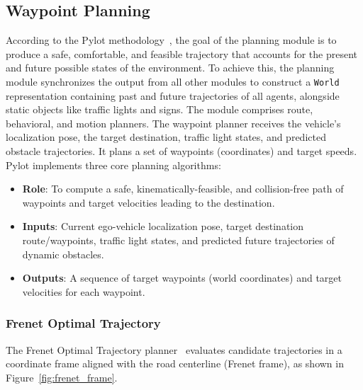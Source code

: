 \documentclass[11pt,a4paper]{report}
\begin{document}
\subsection{Waypoint Planning}
According to the Pylot methodology~\cite{erdos_pylot}, the goal of the planning module is to produce a safe, comfortable, and feasible trajectory that accounts for the present and future possible states of the environment. To achieve this, the planning module synchronizes the output from all other modules to construct a \texttt{World} representation containing past and future trajectories of all agents, alongside static objects like traffic lights and signs. The module comprises route, behavioral, and motion planners. The waypoint planner receives the vehicle's localization pose, the target destination, traffic light states, and predicted obstacle trajectories. It plans a set of waypoints (coordinates) and target speeds. Pylot implements three core planning algorithms:
\begin{itemize}
    \item \textbf{Role}: To compute a safe, kinematically-feasible, and collision-free path of waypoints and target velocities leading to the destination.
    \item \textbf{Inputs}: Current ego-vehicle localization pose, target destination route/waypoints, traffic light states, and predicted future trajectories of dynamic obstacles.
    \item \textbf{Outputs}: A sequence of target waypoints (world coordinates) and target velocities for each waypoint.
\end{itemize}

\subsubsection{Frenet Optimal Trajectory}
The Frenet Optimal Trajectory planner~\cite{frenet_planner} evaluates candidate trajectories in a coordinate frame aligned with the road centerline (Frenet frame), as shown in Figure~\ref{fig:frenet_frame}.
\end{document}
